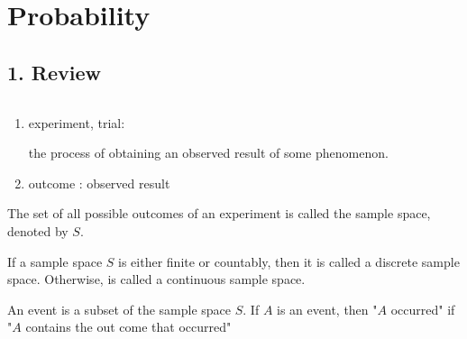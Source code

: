 


\section*{Probability}


\subsection*{1. Review}$ $

\begin{enumerate}[wide, label = $\bullet$]
	\item experiment, trial: 
	 
	the process of obtaining an observed result of some phenomenon.
	\item outcome : observed result
\end{enumerate}

\begin{defn}
	The set of all possible outcomes of an experiment is called the sample space, denoted by $S$.
\end{defn}

\begin{defn}
	If a sample space $S$ is either finite or countably, then it is called a discrete sample space. Otherwise, is called a continuous sample space.
\end{defn}

\begin{defn}
	An event is a subset of the sample space $S$. If $A$ is an event, then "$A$ occurred" if "$A$ contains the out come that occurred"
\end{defn}

%

